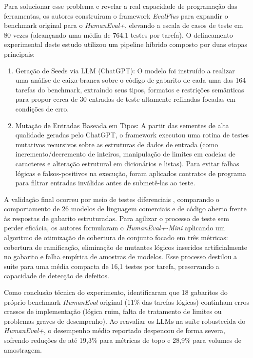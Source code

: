 Para solucionar esse problema e revelar a real capacidade de programação das ferramentas, os autores construíram o framework \textit{EvalPlus} para expandir o benchmark original para o \textit{HumanEval+}, elevando a escala de casos de teste em 80 vezes (alcançando uma média de 764,1 testes por tarefa). O delineamento experimental deste estudo utilizou um pipeline híbrido composto por duas etapas principais:
\begin{enumerate}
    \item Geração de Seeds via LLM (ChatGPT): O modelo foi instruído a realizar uma análise de caixa-branca sobre o código de gabarito de cada uma das 164 tarefas do benchmark, extraindo seus tipos, formatos e restrições semânticas para propor cerca de 30 entradas de teste altamente refinadas focadas em condições de erro.
    \item Mutação de Entradas Baseada em Tipos: A partir das sementes de alta qualidade geradas pelo ChatGPT, o framework executou uma rotina de testes mutativos recursivos sobre as estruturas de dados de entrada (como incremento/decremento de inteiros, manipulação de limites em cadeias de caracteres e alteração estrutural em dicionários e listas). Para evitar falhas lógicas e falsos-positivos na execução, foram aplicados contratos de programa para filtrar entradas inválidas antes de submetê-las ao teste.
\end{enumerate}

A validação final ocorreu por meio de testes diferenciais , comparando o comportamento de 26 modelos de linguagem comerciais e de código aberto frente às respostas de gabarito estruturadas. Para agilizar o processo de teste sem perder eficácia, os autores formularam o \textit{HumanEval+-Mini} aplicando um algoritmo de otimização de cobertura de conjunto  focado em três métricas: cobertura de ramificação, eliminação de mutantes lógicos inseridos artificialmente no gabarito e falha empírica de amostras de modelos. Esse processo destilou a suíte para uma média compacta de 16,1 testes por tarefa, preservando a capacidade de detecção de defeitos.

Como conclusão técnica do experimento,  identificaram que 18 gabaritos do próprio benchmark \textit{HumanEval} original (11\% das tarefas lógicas) continham erros crassos de implementação (lógica ruim, falta de tratamento de limites ou problemas graves de desempenho). Ao reavaliar os LLMs na suíte robustecida do \textit{HumanEval+}, o desempenho médio reportado  despencou de forma severa, sofrendo reduções de até 19,3\% para métricas de topo  e 28,9\% para volumes de amostragem.

